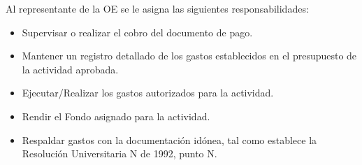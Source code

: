 Al representante de la OE se le asigna las siguientes responsabilidades:

\begin{itemize}
    \item Supervisar o realizar el cobro del documento de pago.
    \item Mantener un registro detallado de los gastos establecidos en el presupuesto de la actividad aprobada.
    \item Ejecutar/Realizar los gastos autorizados para la actividad.
    \item Rendir el Fondo asignado para la actividad.
    \item Respaldar gastos con la documentación idónea, tal como establece la Resolución Universitaria N de 1992, punto N. 
\end{itemize} 